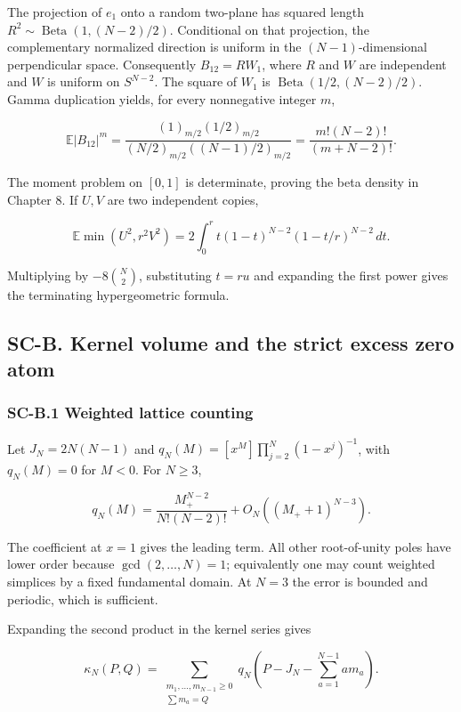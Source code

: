 The projection of \(e_1\) onto a random two-plane has squared length \(R^2\sim\operatorname{Beta}(1,(N-2)/2)\). Conditional on that projection, the complementary normalized direction is uniform in the \((N-1)\)-dimensional perpendicular space. Consequently \(B_{12}=RW_1\), where \(R\) and \(W\) are independent and \(W\) is uniform on \(S^{N-2}\). The square of \(W_1\) is \(\operatorname{Beta}(1/2,(N-2)/2)\). Gamma duplication yields, for every nonnegative integer \(m\),

\[
\mathbb E|B_{12}|^m
=\frac{(1)_{m/2}(1/2)_{m/2}}
{(N/2)_{m/2}((N-1)/2)_{m/2}}
=\frac{m!(N-2)!}{(m+N-2)!}.
\]

The moment problem on \([0,1]\) is determinate, proving the beta density in Chapter 8. If \(U,V\) are two independent copies,

\[
\mathbb E\min(U^2,r^2V^2)
=2\int_0^r t(1-t)^{N-2}(1-t/r)^{N-2}\,dt.
\]

Multiplying by \(-8\binom N2\), substituting \(t=ru\) and expanding the first power gives the terminating hypergeometric formula.

\hypertarget{sc-b.-kernel-volume-and-the-strict-excess-zero-atom}{%
\subsection{SC-B. Kernel volume and the strict excess zero atom}\label{sc-b.-kernel-volume-and-the-strict-excess-zero-atom}}

\hypertarget{sc-b.1-weighted-lattice-counting}{%
\subsubsection{SC-B.1 Weighted lattice counting}\label{sc-b.1-weighted-lattice-counting}}

Let \(J_N=2N(N-1)\) and \(q_N(M)=[x^M]\prod_{j=2}^N(1-x^j)^{-1}\), with \(q_N(M)=0\) for \(M<0\). For \(N\geq3\),

\[
q_N(M)=\frac{M_+^{N-2}}{N!(N-2)!}
+O_N((M_++1)^{N-3}).
\]

The coefficient at \(x=1\) gives the leading term. All other root-of-unity poles have lower order because \(\gcd(2,\ldots,N)=1\); equivalently one may count weighted simplices by a fixed fundamental domain. At \(N=3\) the error is bounded and periodic, which is sufficient.

Expanding the second product in the kernel series gives

\[
\kappa_N(P,Q)=
\sum_{\substack{m_1,\ldots,m_{N-1}\geq0\\\sum m_a=Q}}
q_N\left(P-J_N-\sum_{a=1}^{N-1}a m_a\right).
\]

